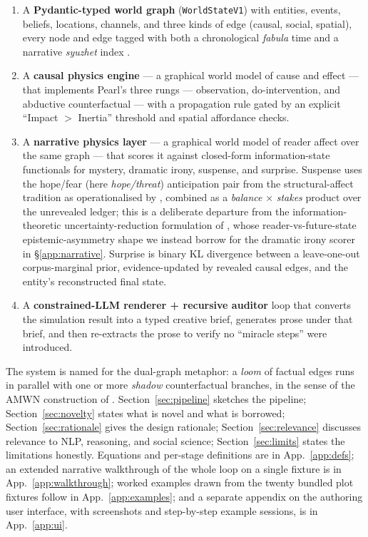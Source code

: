 \documentclass[11pt]{article}
\begin{document}
\begin{enumerate}
\item A \textbf{Pydantic-typed world graph} (\texttt{WorldStateV1})
      with entities, events, beliefs, locations, channels, and three
      kinds of edge (causal, social, spatial), every node and edge
      tagged with both a chronological \emph{fabula} time and a
      narrative \emph{syuzhet} index \citep{shklovsky1965art,
      genette1980narrative}.
\item A \textbf{causal physics engine} --- a graphical world model
      of cause and effect --- that implements Pearl's three
      rungs --- observation, do-intervention, and abductive
      counterfactual --- with a propagation rule gated by an
      explicit ``Impact $>$ Inertia'' threshold and spatial
      affordance checks.
\item A \textbf{narrative physics layer} --- a graphical world
      model of reader affect over the same graph --- that scores it
      against closed-form information-state functionals for mystery,
      dramatic irony, suspense, and surprise. Suspense uses the
      hope/fear (here \emph{hope/threat}) anticipation pair from the
      structural-affect tradition
      \citep{brewer1982stories,comisky1982suspense,ortony1988occ,
      zillmann1996suspense} as operationalised by
      \citet{cheong2015suspenser}, combined as a
      \emph{balance$\,\times\,$stakes} product over the unrevealed
      ledger; this is a deliberate departure from the
      information-theoretic uncertainty-reduction formulation of
      \citet{wilmot2020suspense}, whose reader-vs-future-state
      epistemic-asymmetry shape we instead borrow for the dramatic
      irony scorer in \S\ref{app:narrative}. Surprise is binary KL
      divergence between a leave-one-out corpus-marginal prior,
      evidence-updated by
      revealed causal edges, and the entity's reconstructed final
      state.
\item A \textbf{constrained-LLM renderer + recursive auditor} loop
      \citep{gu2024judge} that converts the simulation result into
      a typed creative brief, generates prose under that brief, and
      then re-extracts the prose to verify no ``miracle steps''
      were introduced.
\end{enumerate}

The system is named for the dual-graph metaphor: a \emph{loom} of
factual edges runs in parallel with one or more \emph{shadow}
counterfactual branches, in the sense of the AMWN construction of
\citet{correa2025amwn}. Section~\ref{sec:pipeline} sketches the
pipeline; Section~\ref{sec:novelty} states what is novel and what
is borrowed; Section~\ref{sec:rationale} gives the design
rationale; Section~\ref{sec:relevance} discusses relevance to NLP,
reasoning, and social science; Section~\ref{sec:limits} states the
limitations honestly. Equations and per-stage definitions are in
App.~\ref{app:defs}; an extended narrative walkthrough of the
whole loop on a single fixture is in App.~\ref{app:walkthrough};
worked examples drawn from the twenty bundled plot fixtures
follow in App.~\ref{app:examples}; and a separate appendix on the
authoring user interface, with screenshots and step-by-step
example sessions, is in App.~\ref{app:ui}.
\end{document}
